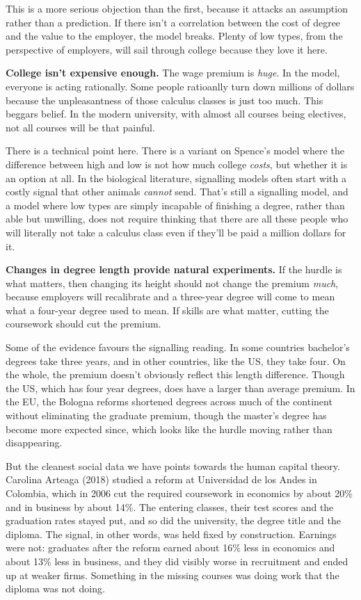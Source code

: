 \documentclass[
  11pt,
  letterpaper,
]{scrbook}
\begin{document}
This is a more serious objection than the first, because it attacks an
assumption rather than a prediction. If there isn't a correlation
between the cost of degree and the value to the employer, the model
breaks. Plenty of low types, from the perspective of employers, will
sail through college because they love it here.

\textbf{College isn't expensive enough.} The wage premium is
\emph{huge}. In the model, everyone is acting rationally. Some people
ratioanlly turn down millions of dollars because the unpleasantness of
those calculus classes is just too much. This beggars belief. In the
modern university, with almost all courses being electives, not all
courses will be that painful.

There is a technical point here. There is a variant on Spence's model
where the difference between high and low is not how much college
\emph{costs}, but whether it is an option at all. In the biological
literature, signalling models often start with a costly signal that
other animals \emph{cannot} send. That's still a signalling model, and a
model where low types are simply incapable of finishing a degree, rather
than able but unwilling, does not require thinking that there are all
these people who will literally not take a calculus class even if
they'll be paid a million dollars for it.

\textbf{Changes in degree length provide natural experiments.} If the
hurdle is what matters, then changing its height should not change the
premium \emph{much}, because employers will recalibrate and a three-year
degree will come to mean what a four-year degree used to mean. If skills
are what matter, cutting the coursework should cut the premium.

Some of the evidence favours the signalling reading. In some countries
bachelor's degrees take three years, and in other countries, like the
US, they take four. On the whole, the premium doesn't obviously reflect
this length difference. Though the US, which has four year degrees, does
have a larger than average premium. In the EU, the Bologna reforms
shortened degrees across much of the continent without eliminating the
graduate premium, though the master's degree has become more expected
since, which looks like the hurdle moving rather than disappearing.

But the cleanest social data we have points towards the human capital
theory. Carolina Arteaga (2018) studied a reform at Universidad de los
Andes in Colombia, which in 2006 cut the required coursework in
economics by about 20\% and in business by about 14\%. The entering
classes, their test scores and the graduation rates stayed put, and so
did the university, the degree title and the diploma. The signal, in
other words, was held fixed by construction. Earnings were not:
graduates after the reform earned about 16\% less in economics and about
13\% less in business, and they did visibly worse in recruitment and
ended up at weaker firms. Something in the missing courses was doing
work that the diploma was not doing.
\end{document}
